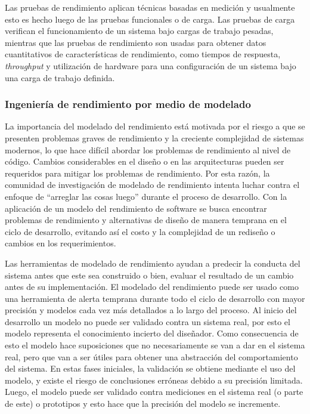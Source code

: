 Las pruebas de rendimiento aplican técnicas basadas en medición y usualmente esto es hecho luego de las pruebas funcionales o de carga. Las pruebas de carga verifican el funcionamiento de un sistema bajo cargas de trabajo pesadas, mientras que las pruebas de rendimiento son usadas para obtener datos cuantitativos de características de rendimiento, como tiempos de respuesta, \emph{throughput} y utilización de hardware para una configuración de un sistema bajo una carga de trabajo definida.

\subsubsection{Ingeniería de rendimiento por medio de modelado} 
La importancia del modelado del rendimiento está motivada por el riesgo a que se presenten problemas graves de rendimiento y la creciente complejidad de sistemas modernos, lo que hace difícil abordar los problemas de rendimiento al nivel de código\cite{Reussner:2016:MSS:3036121}. Cambios considerables en el diseño o en las arquitecturas pueden ser requeridos para mitigar los problemas de rendimiento. Por esta razón, la comunidad de investigación de modelado de rendimiento intenta luchar contra el enfoque de ``arreglar las cosas luego'' durante el proceso de desarrollo. Con la aplicación de un modelo del rendimiento de software se busca encontrar problemas de rendimiento y alternativas de diseño de manera temprana en el ciclo de desarrollo, evitando así el costo y la complejidad de un rediseño o cambios en los requerimientos.

Las herramientas de modelado de rendimiento ayudan a predecir la conducta del sistema antes que este sea construido o bien, evaluar el resultado de un cambio antes de su implementación. El modelado del rendimiento puede ser usado como una herramienta de alerta temprana durante todo el ciclo de desarrollo con mayor precisión y modelos cada vez más detallados a lo largo del proceso. Al inicio del desarrollo un modelo no puede ser validado contra un sistema real, por esto el modelo representa el conocimiento incierto del diseñador. Como consecuencia de esto el modelo hace suposiciones que no necesariamente se van a dar en el sistema real, pero que van a ser útiles para obtener una abstracción del comportamiento del sistema. En estas fases iniciales, la validación se obtiene mediante el uso del modelo, y existe el riesgo de conclusiones erróneas debido a su precisión limitada. Luego, el modelo puede ser validado contra mediciones en el sistema real (o parte de este) o prototipos y esto hace que la precisión del modelo se incremente.

